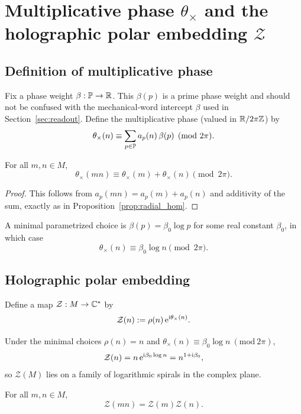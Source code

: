 \section{Multiplicative phase \texorpdfstring{$\theta_\times$}{theta\_times} and the holographic polar embedding \texorpdfstring{$\mathcal{Z}$}{Z}}
\label{sec:embedding}

\subsection{Definition of multiplicative phase}
Fix a phase weight $\beta:\mathbb{P}\to\mathbb{R}$. This $\beta(p)$ is a prime phase weight and should not be confused with the mechanical-word intercept $\beta$ used in Section~\ref{sec:readout}. Define the multiplicative phase (valued in $\mathbb{R}/2\pi\mathbb{Z}$) by
$$
\theta_\times(n)\equiv \sum_{p\in\mathbb{P}} a_p(n)\,\beta(p)\pmod{2\pi}.
$$

\begin{proposition}
\label{prop:phase_hom}
For all $m,n\in M$,
$$
\theta_\times(mn)\equiv\theta_\times(m)+\theta_\times(n)\pmod{2\pi}.
$$
\end{proposition}

\begin{proof}
This follows from $a_p(mn)=a_p(m)+a_p(n)$ and additivity of the sum, exactly as in Proposition~\ref{prop:radial_hom}.
\end{proof}

A minimal parametrized choice is $\beta(p)=\beta_0\log p$ for some real constant $\beta_0$, in which case
$$
\theta_\times(n)\equiv \beta_0\log n\pmod{2\pi}.
$$

\subsection{Holographic polar embedding}
\begin{definition}
\label{def:Z_embedding}
Define a map $\mathcal{Z}:M\to\mathbb{C}^*$ by
$$
\mathcal{Z}(n):=\rho(n)\,\mathrm{e}^{\mathrm{i}\theta_\times(n)}.
$$
\end{definition}

Under the minimal choices $\rho(n)=n$ and $\theta_\times(n)\equiv\beta_0\log n\ (\mathrm{mod}\ 2\pi)$,
$$
\mathcal{Z}(n)=n\,\mathrm{e}^{\mathrm{i}\beta_0\log n}=n^{1+\mathrm{i}\beta_0},
$$
so $\mathcal{Z}(M)$ lies on a family of logarithmic spirals in the complex plane.

\begin{theorem}
\label{thm:Z_mult}
For all $m,n\in M$,
$$
\mathcal{Z}(mn)=\mathcal{Z}(m)\mathcal{Z}(n).
$$
\end{theorem}


